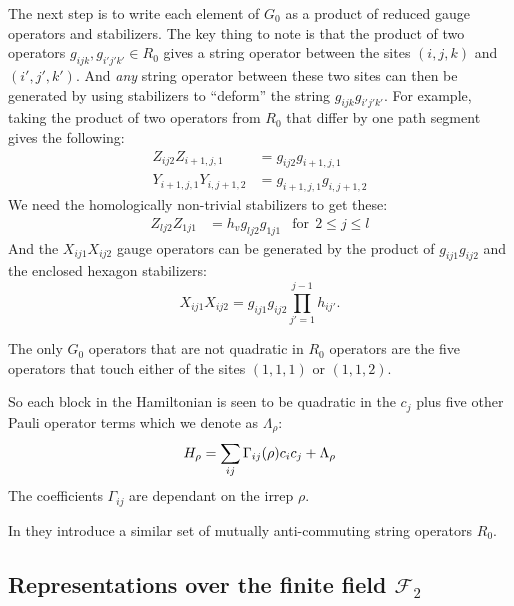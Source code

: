 \documentclass[12pt]{article}
\begin{document}
The next step is to write each element of $G_0$
as a product of reduced gauge operators and stabilizers.
The key thing to note is that the product of two
operators $g_{ijk}, g_{i'j'k'}\in R_0$ gives a string
operator between the sites $(i,j,k)$ and $(i',j',k')$.
And {\it any} string operator between these
two sites can then be generated by using stabilizers to
``deform'' the string $g_{ijk}g_{i'j'k'}.$
For example, taking the product
of two operators from $R_0$ that differ
by one path segment gives the following:
\begin{align*}
Z_{ij2}Z_{i+1,j,1} &= g_{ij2} g_{i+1,j,1} \\
Y_{i+1,j,1}Y_{i,j+1,2} &= g_{i+1,j,1}g_{i,j+1,2}
\end{align*}
We need the homologically non-trivial stabilizers to get these:
\begin{align*}
Z_{lj2}Z_{1j1} &= h_v g_{lj2} g_{1j1} &\mbox{for}\ \  2\le j\le l
\end{align*}
And the $X_{ij1}X_{ij2}$
gauge operators can be generated
by the product of 
$g_{ij1}g_{ij2}$ and the enclosed hexagon stabilizers:
$$X_{ij1}X_{ij2}=g_{ij1}g_{ij2}\prod_{j'=1}^{j-1} h_{ij'}.$$

The only $G_0$ operators that are not 
quadratic in $R_0$ operators are the five
operators that touch either of the sites
$(1,1,1)$ or $(1,1,2)$.

So each block in the Hamiltonian
is seen to be quadratic in the $c_j$ plus
five other Pauli operator terms which we denote as $\Lambda_\rho$:
$$
    H_\rho = \sum_{ij} \Gamma_{ij}(\rho) c_i c_j + \Lambda_\rho
$$
The coefficients $\Gamma_{ij}$ are dependant on the irrep $\rho.$

In \cite{Kells2009} they introduce a similar set of
mutually anti-commuting string operators $R_0.$


%

\def\Cn{\Complex[2^n]}
\def\Cr{\Complex[2^r]}
\def\Field{\mathcal{F}_2}
\def\Fn{\Field[n]}
\def\Fr{\Field[r]}

\subsection{Representations over the finite field $\Field$}
\end{document}
